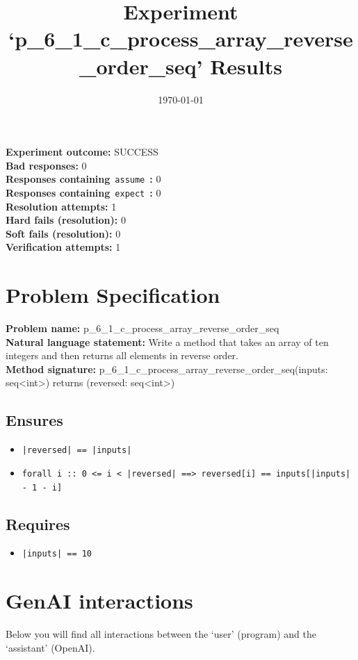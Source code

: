 \documentclass{article}
\begin{document}
\title{Experiment `p\_6\_1\_c\_process\_array\_reverse\_order\_seq' Results}
\author{\today}
\date{}
\maketitle
\textbf{Experiment outcome: }SUCCESS
\\\textbf{Bad responses: }0
\\\textbf{Responses containing}~\texttt{assume}~\textbf{: }0
\\\textbf{Responses containing}~\texttt{expect}~\textbf{: }0
\\\textbf{Resolution attempts: }1
\\\textbf{Hard fails (resolution): }0
\\\textbf{Soft fails (resolution): }0
\\\textbf{Verification attempts: }1
\section*{Problem Specification}
\textbf{Problem name: }p\_6\_1\_c\_process\_array\_reverse\_order\_seq
\\\textbf{Natural language statement: }Write a method that takes an array of ten integers and then returns all elements in reverse order.
\\\textbf{Method signature: }p\_6\_1\_c\_process\_array\_reverse\_order\_seq(inputs: seq<int>) returns (reversed: seq<int>)
\subsection*{Ensures}
\begin{itemize}
\item \texttt{|reversed| == |inputs|}
\item \texttt{forall i :: 0 <= i < |reversed| ==> reversed[i] == inputs[|inputs| - 1 - i]}
\end{itemize}
\subsection*{Requires}
\begin{itemize}
\item \texttt{|inputs| == 10}
\end{itemize}
\clearpage
\section*{GenAI interactions}
Below you will find all interactions between the `user' (program) and the `assistant' (OpenAI).
\end{document}
